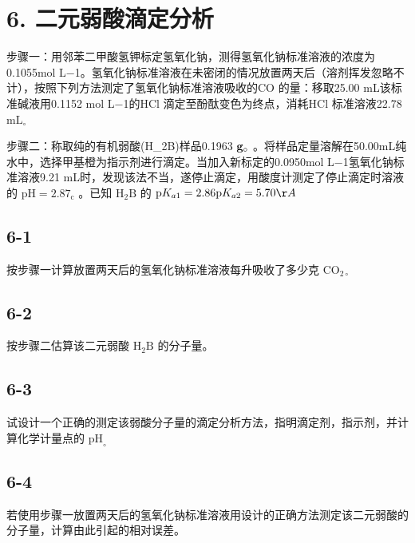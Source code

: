 \section*{6. 二元弱酸滴定分析}
步骤⼀：⽤邻苯⼆甲酸氢钾标定氢氧化钠，测得氢氧化钠标准溶液的浓度为0.1055mol L−1。氢氧化钠标准溶液在未密闭的情况放置两天后（溶剂挥发忽略不计），按照下列⽅法测定了氢氧化钠标准溶液吸收的CO 的量：移取25.00 mL该标准碱液⽤0.1152 mol L−1的HCl 滴定⾄酚酞变⾊为终点，消耗HCl 标准溶液22.78$\mathrm { m L } _ { \circ }$

步骤⼆：称取纯的有机弱酸(H_{2}B)样品0.1963 ${ \bf g } _ { \circ }$ 。将样品定量溶解在50.00mL纯⽔中，选择甲基橙为指⽰剂进⾏滴定。当加⼊新标定的0.0950mol L−1氢氧化钠标准溶液9.21 mL时，发现该法不当，遂停⽌滴定，⽤酸度计测定了停⽌滴定时溶液的 $\mathrm { p H } = 2 . 8 7 _ { \mathrm { c } }$ 。已知 $\mathrm { H _ { 2 } B }$ 的 $\mathrm { p } K _ { a 1 } = 2 . 8 6 \mathrm { p } K _ { a 2 } = 5 . 7 0 \AA$

\subsection*{6-1}
按步骤⼀计算放置两天后的氢氧化钠标准溶液每升吸收了多少克 $\mathrm { { C O } _ { 2 \circ } }$

\subsection*{6-2}
按步骤⼆估算该⼆元弱酸 $\mathrm { H _ { 2 } B }$ 的分⼦量。

\subsection*{6-3}
试设计⼀个正确的测定该弱酸分⼦量的滴定分析⽅法，指明滴定剂，指⽰剂，并计算化学计量点的 $\mathrm { p H } _ { \circ }$

\subsection*{6-4}
若使⽤步骤⼀放置两天后的氢氧化钠标准溶液⽤设计的正确⽅法测定该⼆元弱酸的分⼦量，计算由此引起的相对误差。
